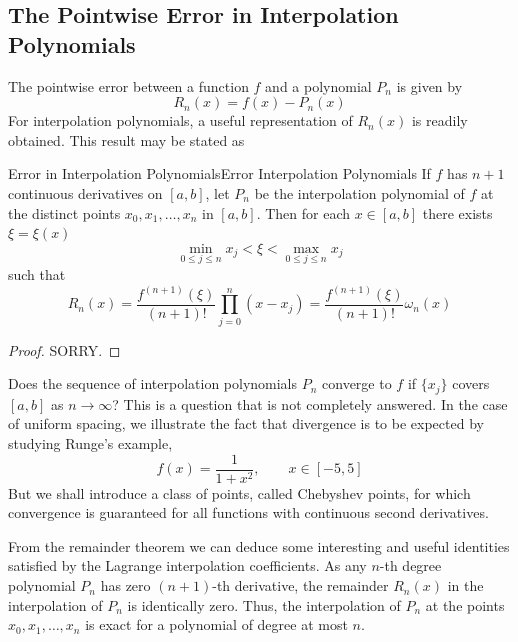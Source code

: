 \documentclass[../main.tex]{subfiles}
\begin{document}
\subsection{The Pointwise Error in Interpolation Polynomials}
The pointwise error between a function $f$ and a polynomial $P_n$ is given by
\begin{equation}
	R_n(x) = f(x) - P_n(x)
\end{equation}
For interpolation polynomials, a useful representation of $R_n(x)$ is readily obtained. This result may be stated as
\begin{theorem}{Error in Interpolation Polynomials}{Error Interpolation Polynomials}
	If $f$ has $n+1$ continuous derivatives on $[a,b]$, let $P_n$ be the interpolation polynomial of $f$ at the distinct points $x_0, x_1, \dots, x_n$ in $[a,b]$. Then for each $x \in [a,b]$ there exists $\xi = \xi(x)$
	\begin{equation}
		\min_{0 \leq j \leq n} x_j < \xi < \max_{0 \leq j \leq n} x_j
	\end{equation}
	such that
	\begin{equation}
		R_n(x) = \frac{f^{(n+1)}(\xi)}{(n+1)!} \prod_{j=0}^n (x - x_j) = \frac{f^{(n+1)}(\xi)}{(n+1)!} \omega_n(x)
	\end{equation}
\end{theorem}
\begin{proof}
	SORRY.
\end{proof}

Does the sequence of interpolation polynomials $P_n$ converge to $f$ if $\{x_j\}$ covers $[a,b]$ as $n \to \infty$? This is a question that is not completely answered. In the case of uniform spacing, we illustrate the fact that divergence is to be expected by studying Runge's example,
\begin{equation}
	f(x) = \frac{1}{1 + x^2}, \qquad x \in [-5,5]
\end{equation}
But we shall introduce a class of points, called Chebyshev points, for which convergence is guaranteed for all functions with continuous second derivatives.

From the remainder theorem we can deduce some interesting and useful identities satisfied by the Lagrange interpolation coefficients. As any $n$-th degree polynomial $P_n$ has zero $(n+1)$-th derivative, the remainder $R_n(x)$ in the interpolation of $P_n$ is identically zero. Thus, the interpolation of $P_n$ at the points $x_0, x_1, \dots, x_n$ is exact for a polynomial of degree at most $n$.
\end{document}
